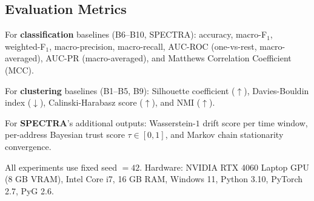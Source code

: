 
\subsection{Evaluation Metrics}
\label{subsec:metrics}

For \textbf{classification} baselines (B6--B10, SPECTRA): accuracy,
macro-F$_1$, weighted-F$_1$, macro-precision, macro-recall,
AUC-ROC (one-vs-rest, macro-averaged), AUC-PR (macro-averaged),
and Matthews Correlation Coefficient (MCC).

For \textbf{clustering} baselines (B1--B5, B9):
Silhouette coefficient ($\uparrow$), Davies-Bouldin index ($\downarrow$),
Calinski-Harabasz score ($\uparrow$), and NMI ($\uparrow$).

For \textbf{SPECTRA}'s additional outputs: Wasserstein-$1$ drift score
per time window, per-address Bayesian trust score $\tau \in [0,1]$,
and Markov chain stationarity convergence.

All experiments use fixed seed $= 42$.
Hardware: NVIDIA RTX 4060 Laptop GPU (8 GB VRAM), Intel Core i7,
16 GB RAM, Windows 11, Python 3.10, PyTorch 2.7, PyG 2.6.

